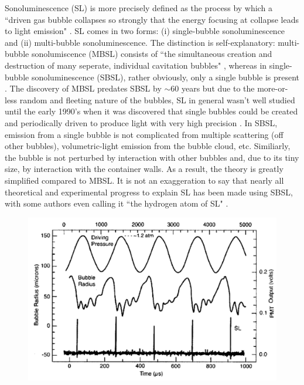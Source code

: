 \documentclass[rmp,aps,nofootinbib,superscriptaddress,floatfix]{revtex4-2}
\begin{document}
Sonoluminescence (SL) is more precisely defined as the process by which a ``driven gas bubble collapses so strongly that the energy focusing at collapse leads to light emission" \cite{brenner2002single}. SL comes in two forms: (i) single-bubble sonoluminescence and (ii) multi-bubble sonoluminescence. The distinction is self-explanatory: multi-bubble sonolumiscence (MBSL) consists of  ``the simultaneous creation and destruction of many seperate, individual cavitation bubbles" \cite{crum1994sonoluminescence,brenner2002single}, whereas in single-bubble sonoluminescence (SBSL), rather obviously, only a single bubble is present \cite{gaitan1992sonoluminescence}. The discovery of MBSL predates SBSL by $\sim$60 years but due to the more-or-less random and fleeting nature of the bubbles, SL in general wasn't well studied until the early 1990's when it was discovered that single bubbles could be created and periodically driven to produce light with very high precision \cite{crum1994sonoluminescence,gaitan1990experimental,gaitan1992sonoluminescence,brenner2002single}. In SBSL, emission from a single bubble is not complicated from multiple scattering (off other bubbles), volumetric-light emission from the bubble cloud, etc. Similiarly, the bubble is not perturbed by interaction with other bubbles and, due to its tiny size, by interaction with the container walls. As a result, the theory is greatly simplified compared to MBSL. It is not an exaggeration to say that nearly all theoretical and experimental progress to explain SL has been made using SBSL, with some authors even calling it ``the hydrogen atom of SL" \cite{lohse2018bubble,crum1994sonoluminescence}. 

\begin{figure}
\includegraphics[width=0.6\linewidth]{figs/pulses}
    \caption{\cite{brenner2002single,crum1994sonoluminescence}}
\label{fig:pulses}
\end{figure}
\end{document}
